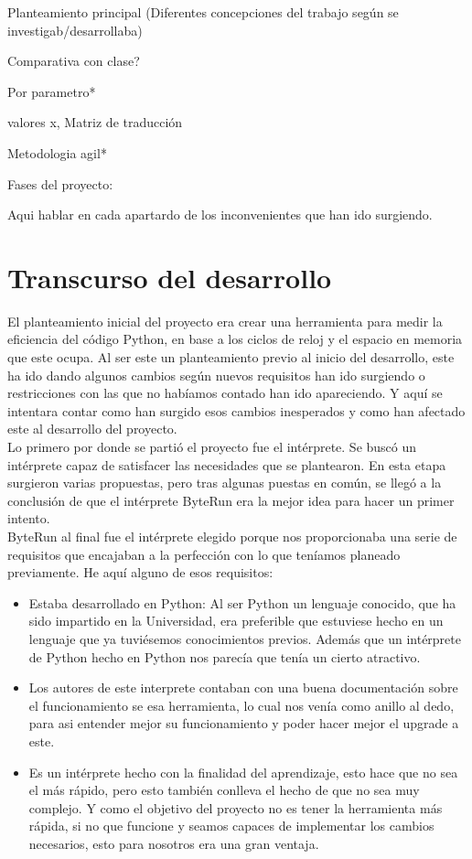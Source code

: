 

Planteamiento principal (Diferentes concepciones del trabajo según se investigab/desarrollaba)

Comparativa con clase?

Por parametro*

valores x, Matriz de traducción

Metodologia agil*

Fases del proyecto:

Aqui  hablar en cada apartardo de los inconvenientes que han ido surgiendo.
\section{Transcurso del desarrollo}

El planteamiento inicial del proyecto era crear una herramienta para medir la eficiencia del código Python, en base a los ciclos de reloj y el espacio en memoria que este ocupa. Al ser este un planteamiento previo al inicio del desarrollo, este ha ido dando algunos cambios según nuevos requisitos han ido surgiendo o restricciones con las que no habíamos contado han ido apareciendo. Y aquí se intentara contar como han surgido esos cambios inesperados y como han afectado este al desarrollo del proyecto.\\
Lo primero por donde se partió el proyecto fue el intérprete. Se buscó un intérprete capaz de satisfacer las necesidades que se plantearon. En esta etapa surgieron varias propuestas, pero tras algunas puestas en común, se llegó a la conclusión de que el intérprete ByteRun era la mejor idea para hacer un primer intento.\\
ByteRun al final fue el intérprete elegido porque nos proporcionaba una serie de requisitos que encajaban a la perfección con lo que teníamos planeado previamente. He aquí alguno de esos requisitos:
\begin{itemize}
	\item Estaba desarrollado en Python: Al ser Python un lenguaje conocido, que ha sido impartido en la Universidad, era preferible que estuviese hecho en un lenguaje que ya tuviésemos conocimientos previos. Además que un intérprete de Python hecho en Python nos parecía que tenía un cierto atractivo.
	\item Los autores de este interprete contaban con una buena documentación sobre el funcionamiento se esa herramienta, lo cual nos venía como anillo al dedo, para asi entender mejor su funcionamiento y poder hacer mejor el upgrade a este.
	\item Es un intérprete hecho con la finalidad del aprendizaje, esto hace que no sea el más rápido, pero esto también conlleva el hecho de que no sea muy complejo. Y como el objetivo del proyecto no es tener la herramienta más rápida, si no que funcione y seamos capaces de implementar los cambios necesarios, esto para nosotros era una gran ventaja.
\end{itemize}

